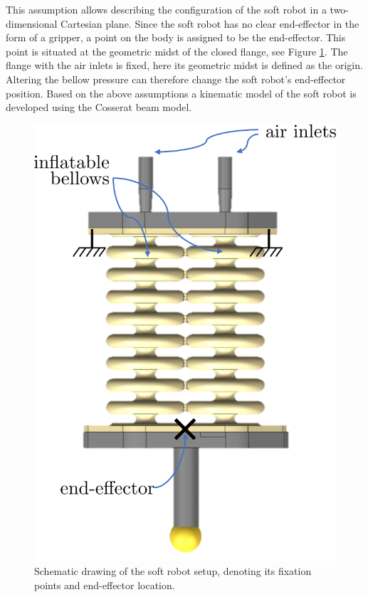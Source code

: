 This assumption allows describing the configuration of the soft robot in a two-dimensional Cartesian plane. Since the soft robot has no clear end-effector in the form of a gripper, a point on the body is assigned to be the end-effector. This point is situated at the geometric midst of the closed flange, see Figure \ref{fig2:setup}. The flange with the air inlets is fixed, here its geometric midst is defined as the origin. Altering the bellow pressure can therefore change the soft robot's end-effector position. Based on the above assumptions a kinematic model of the soft robot is developed using the Cosserat beam model. 



\begin{figure}[H]
\begin{minipage}{.5\textwidth}
  \centering
  \includegraphics[width =0.8\linewidth]{Figures/Chapter2/setup.png}
  \caption{Schematic drawing of the soft robot setup, denoting its fixation points and end-effector location.}
  \label{fig2:setup}
\end{minipage}
\begin{minipage}{.5\textwidth}
  \centering

\end{minipage}
\end{figure}
